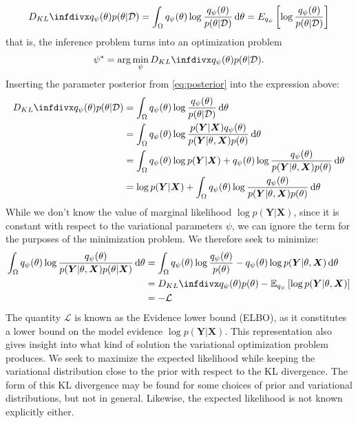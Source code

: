 \begin{align}
    \kld{q_\psi(\theta)}{p(\theta|\D)} 
    = \int_{\Omega} q_\psi(\theta)\log{\frac{q_\psi(\theta)}{p(\theta|\D)}} \dd{\theta} 
    = E_{q_\psi}\left[\log{\frac{q_\psi(\theta)}{p(\theta|\D)}}\right]
\end{align}
that is, the inference problem turns into an optimization problem 
\begin{align}
    \psi^\ast=\arg\min_{\psi}{\kld{q_\psi(\theta)}{p(\theta|\D)} }.
\end{align} 
Inserting the parameter posterior from \cref{eq:posterior} into the expression above:
\begin{align}
    \kld{q_\psi(\theta)}{p(\theta|\D)} 
    &= \int_{\Omega} q_\psi(\theta)\log{\frac{q_\psi(\theta)}{p(\theta|\D)}} \dd{\theta} \\
    &= \int_{\Omega} q_\psi(\theta)\log{\frac{p(\bm{Y}|\bm{X})q_\psi(\theta)}{p(\bm{Y} |\theta, \bm{X}) p(\theta)}} \dd{\theta} \\
    &= \int_{\Omega} q_\psi(\theta)\log{p(\bm Y|\bm{X})} + q_\psi(\theta)\log{\frac{q_\psi(\theta)}{p(\bm{Y} |\theta, \bm{X}) p(\theta)}} \dd{\theta} \\
    &= \log{p(\bm{Y}|\bm{X})} + \int_{\Omega} q_\psi(\theta)\log{\frac{q_\psi(\theta)}{p(\bm{Y} |\theta, \bm{X}) p(\theta)}} \dd{\theta} 
\end{align}
While we don't know the value of marginal likelihood $\log{p(\bm{Y}|\bm{X})}$, since it is constant with respect to the variational parameters $\psi$, we can ignore the term for the purposes of the minimization problem.
We therefore seek to minimize:
\begin{align} \label{eq:elbo}
    \int_{\Omega} q_\psi(\theta)\log{\frac{q_\psi(\theta)}{p(\bm{Y} |\theta, \bm{X}) p(\theta|\bm{X})}} \dd{\theta} 
    &= \int_{\Omega} q_\psi(\theta) \log{\frac{q_\psi(\theta)}{p(\theta)}} -q_\psi(\theta)\log{p(\bm{Y} |\theta, \bm{X})} \dd{\theta}\\
    &= \kld{q_\psi(\theta)}{p(\theta)}  - \E_{q_\psi}\left[ \log{p(\bm{Y} |\theta, \bm{X})}  \right]  \\
    &= -\mathcal{L}
\end{align}
The quantity $\mathcal{L}$ is known as the Evidence lower bound (ELBO), as it constitutes a lower bound on the model evidence $\log{p(\bm{Y}|\bm{X})}$. 
This representation also gives insight into what kind of solution the variational optimization problem produces. 
We seek to maximize the expected likelihood while keeping the variational distribution close to the prior with respect to the KL divergence.
The form of this KL divergence may be found for some choices of prior and variational distributions, but not in general.
Likewise, the expected likelihood is not known explicitly either.

